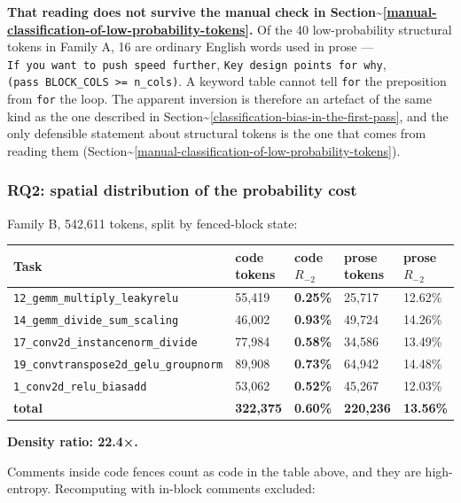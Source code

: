 \documentclass[
  11pt,
]{article}
\begin{document}
\textbf{That reading does not survive the manual check in
Section\textasciitilde{}\ref{manual-classification-of-low-probability-tokens}.}
Of the 40 low-probability structural tokens in Family A, 16 are ordinary
English words used in prose ---
\texttt{If\ you\ want\ to\ push\ speed\ further},
\texttt{Key\ design\ points\ for\ why},
\texttt{(pass\ BLOCK\_COLS\ \textgreater{}=\ n\_cols)}. A keyword table
cannot tell \texttt{for} the preposition from \texttt{for} the loop. The
apparent inversion is therefore an artefact of the same kind as the one
described in
Section\textasciitilde{}\ref{classification-bias-in-the-first-pass}, and
the only defensible statement about structural tokens is the one that
comes from reading them
(Section\textasciitilde{}\ref{manual-classification-of-low-probability-tokens}).

\hypertarget{rq2-spatial-distribution-of-the-probability-cost}{%
\subsubsection{RQ2: spatial distribution of the probability
cost}\label{rq2-spatial-distribution-of-the-probability-cost}}

Family B, 542,611 tokens, split by fenced-block state:

\begin{longtable}[]{@{}lllll@{}}
\toprule
Task & code tokens & code \(R_{-2}\) & prose tokens & prose
\(R_{-2}\) \\
\midrule
\endhead
\texttt{12\_gemm\_multiply\_leakyrelu} & 55,419 & \textbf{0.25\%} &
25,717 & 12.62\% \\
\texttt{14\_gemm\_divide\_sum\_scaling} & 46,002 & \textbf{0.93\%} &
49,724 & 14.26\% \\
\texttt{17\_conv2d\_instancenorm\_divide} & 77,984 & \textbf{0.58\%} &
34,586 & 13.49\% \\
\texttt{19\_convtranspose2d\_gelu\_groupnorm} & 89,908 & \textbf{0.73\%}
& 64,942 & 14.48\% \\
\texttt{1\_conv2d\_relu\_biasadd} & 53,062 & \textbf{0.52\%} & 45,267 &
12.03\% \\
\textbf{total} & \textbf{322,375} & \textbf{0.60\%} & \textbf{220,236} &
\textbf{13.56\%} \\
\bottomrule
\end{longtable}

\textbf{Density ratio: 22.4×.}

Comments inside code fences count as code in the table above, and they
are high-entropy. Recomputing with in-block comments excluded:
\end{document}
